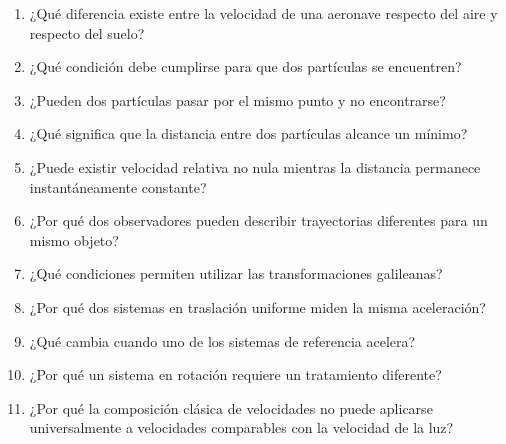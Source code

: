 \begin{enumerate}
    \item ¿Qué diferencia existe entre
    la velocidad de una aeronave respecto
    del aire y respecto del suelo?

    \item ¿Qué condición debe cumplirse
    para que dos partículas se encuentren?

    \item ¿Pueden dos partículas pasar
    por el mismo punto y no encontrarse?

    \item ¿Qué significa que la distancia
    entre dos partículas alcance un mínimo?

    \item ¿Puede existir velocidad relativa
    no nula mientras la distancia
    permanece instantáneamente constante?

    \item ¿Por qué dos observadores pueden
    describir trayectorias diferentes
    para un mismo objeto?

    \item ¿Qué condiciones permiten utilizar
    las transformaciones galileanas?

    \item ¿Por qué dos sistemas en traslación
    uniforme miden la misma aceleración?

    \item ¿Qué cambia cuando uno de
    los sistemas de referencia acelera?

    \item ¿Por qué un sistema en rotación
    requiere un tratamiento diferente?

    \item ¿Por qué la composición clásica
    de velocidades no puede aplicarse
    universalmente a velocidades
    comparables con la velocidad de la luz?

\end{enumerate}


